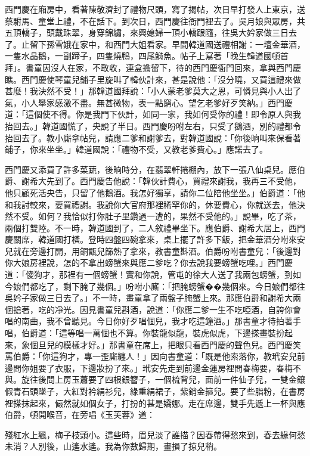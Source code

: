 西門慶在廂房中，看著陳敬濟封了禮物尺頭，寫了揭帖，次日早打發人上東京，送蔡駙馬、童堂上禮，不在話下。到次日，西門慶往衙門裡去了。吳月娘與眾房，共五頂轎子，頭戴珠翠，身穿錦繡，來興媳婦一頂小轎跟隨，往吳大妗家做三日去了。止留下孫雪娥在家中，和西門大姐看家。早間韓道國送禮相謝：一壇金華酒，一隻水晶鵝，一副蹄子，四隻燒鴨，四尾鰣魚。帖子上寫著「晚生韓道國頓首拜」。書童因沒人在家，不敢收，連盒擔留下，待的西門慶衙門回來，拿與西門慶瞧。西門慶使琴童兒鋪子里旋叫了韓伙計來，甚是說他：「沒分曉，又買這禮來做甚麼！我決然不受！」那韓道國拜說：「小人蒙老爹莫大之恩，可憐見與小人出了氣，小人舉家感激不盡。無甚微物，表一點窮心。望乞老爹好歹笑納。」西門慶道：「這個使不得。你是我門下伙計，如同一家，我如何受你的禮！即令原人與我抬回去。」韓道國慌了，央說了半日。西門慶吩咐左右，只受了鵝酒，別的禮都令抬回去了。教小廝拿帖兒，請應二爹和謝爹去，對韓道國說：「你後晌叫來保看著鋪子，你來坐坐。」韓道國說：「禮物不受，又教老爹費心。」應諾去了。

西門慶又添買了許多菜蔬，後晌時分，在翡翠軒捲棚內，放下一張八仙桌兒。應伯爵、謝希大先到了。西門慶告他說：「韓伙計費心，買禮來謝我，我再三不受他，他只顧死活央告，只留了他鵝酒。我怎好獨享，請你二位陪他坐坐。」伯爵道：「他和我討較來，要買禮謝。我說你大官府那裡稀罕你的，休要費心，你就送去，他決然不受。如何？我恰似打你肚子里鑽過一遭的，果然不受他的。」說畢，吃了茶，兩個打雙陸。不一時，韓道國到了，二人敘禮畢坐下。應伯爵、謝希大居上，西門慶關席，韓道國打橫。登時四盤四碗拿來，桌上擺了許多下飯，把金華酒分咐來安兒就在旁邊打開，用銅甑兒篩熱了拿來，教書童斟酒。伯爵吩咐書童兒：「後邊對你大娘房裡說，怎的不拿出螃蟹來與應二爹吃？你去說我要螃蟹吃哩。」西門慶道：「傻狗才，那裡有一個螃蟹！實和你說，管屯的徐大人送了我兩包螃蟹，到如今娘們都吃了，剩下腌了幾個。」吩咐小廝：「把腌螃蟹��幾個來。今日娘們都往吳妗子家做三日去了。」不一時，畫童拿了兩盤子腌蟹上來。那應伯爵和謝希大兩個搶著，吃的凈光。因見書童兒斟酒，說道：「你應二爹一生不吃啞酒，自誇你會唱的南曲，我不曾聽見。今日你好歹唱個兒，我才吃這鐘酒。」那書童才待拍著手唱，伯爵道：「這等唱一萬個也不算。你裝龍似龍，裝虎似虎，下邊搽畫裝扮起來，象個旦兒的模樣才好。」那書童在席上，把眼只看西門慶的聲色兒。西門慶笑罵伯爵：「你這狗才，專一歪廝纏人！」因向書童道：「既是他索落你，教玳安兒前邊問你姐要了衣服，下邊妝扮了來。」玳安先走到前邊金蓮房裡問春梅要，春梅不與。旋往後問上房玉蕭要了四根銀簪子，一個梳背兒，面前一件仙子兒，一雙金鑲假青石頭墜子，大紅對衿絹衫兒，綠重絹裙子，紫銷金箍兒。要了些脂粉，在書房裡搽抹起來，儼然就如個女子，打扮的甚是嬌娜。走在席邊，雙手先遞上一杯與應伯爵，頓開喉音，在旁唱《玉芙蓉》道：

殘紅水上飄，梅子枝頭小。這些時，眉兒淡了誰描？因春帶得愁來到，春去緣何愁未消？人別後，山遙水遙。我為你數歸期，畫損了掠兒稍。

